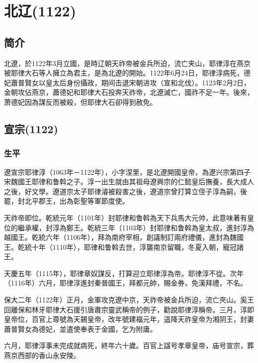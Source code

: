 
\section{北辽\tiny(1122)}

\subsection{简介}

北遼，於1122年3月立國，是時辽朝天祚帝被金兵所迫，流亡夹山，耶律淳在燕京被耶律大石等人擁立為君主，是為北遼的開始。1122年6月24日，耶律淳病死，德妃蕭普賢女以皇太后身份攝政，期间击退宋朝进攻（宣和北伐）。1123年2月2日，金朝攻佔燕京，蕭德妃和耶律大石投奔天祚帝，北遼滅亡，國祚不足一年。後來，萧德妃因為謀反而被殺，但耶律大石卻得到赦免。

\subsection{宣宗\tiny(1122)}

\subsubsection{生平}

遼宣宗耶律淳（1063年－1122年），小字涅里，是北遼開國皇帝，為遼兴宗第四子宋魏國王耶律和鲁斡之子。淳一出生就由其祖母遼興宗的仁懿皇后撫養，長大成人之後，好文學。遼道宗太子耶律濬被殺害之後，遼道宗曾打算立侄子淳為嗣，後罷，封北平郡王，出為彰聖等軍節度使。

天祚帝即位。乾統元年（1101年）封耶律和鲁斡為天下兵馬大元帅，此意味著有皇位的繼承權，封淳為鄭王。乾統三年（1103年）封耶律和鲁斡為皇太叔，進封淳為越國王。乾統六年（1106年），拜為南府宰相，創議制訂兩府禮儀，進封為魏國王。乾統十年（1110年），耶律和鲁斡去世，淳襲南京留職，冬夏入朝，寵冠諸王。

天慶五年（1115年），耶律章奴謀反，打算迎立耶律淳為帝。耶律淳不從。次年（1116年）六月，耶律淳進封秦晉國王，拜都元帥，賜金券，免漢拜禮，不名。

保大二年（1122年）正月，金軍攻克遼中京，天祚帝被金兵所迫，流亡夾山。奚王回離保和林牙耶律大石援引唐肅宗靈武稱帝的例子，勸說耶律淳稱帝。三月，淳即皇帝位，百官上尊號為天錫皇帝，改年號建福元年，遥降天祚皇帝为湘阴王，封妻蕭普賢女為德妃，並遣使奉表于金國，乞为附庸。

六月，耶律淳事未完成就病死，終年六十歲。百官上諡号孝章皇帝，庙号宣宗，葬燕京西部的香山永安陵。


